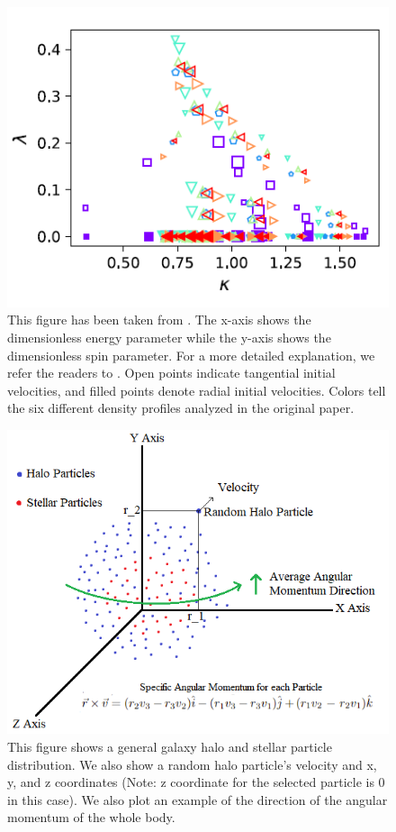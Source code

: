 \documentclass[twocolumn]{aastex631}
\begin{document}
\begin{figure}[ht]
    \centering
    \includegraphics[width=1.4 \columnwidth]{Paper Image.png}
    \caption{This figure has been taken from \citet{2019MNRAS.487..993D}. The x-axis shows the dimensionless energy parameter while the y-axis shows the dimensionless spin parameter. For a more detailed explanation, we refer the readers to \citet{2019MNRAS.487..993D}. Open points indicate
    tangential initial velocities, and filled points denote radial initial velocities. Colors tell the six different density profiles analyzed in the original paper.}
    \label{Paper}
\end{figure}

\begin{figure}[ht]
    \centering
    \includegraphics[width=1.4 \columnwidth]{Method Pict.png}
    \caption{This figure shows a general galaxy halo and stellar particle distribution. We also show a random halo particle's velocity and x, y, and z coordinates (Note: z coordinate for the selected particle is 0 in this case). We also plot an example of the direction of the angular momentum of the whole body.}
    \label{Method}
\end{figure}
\end{document}
